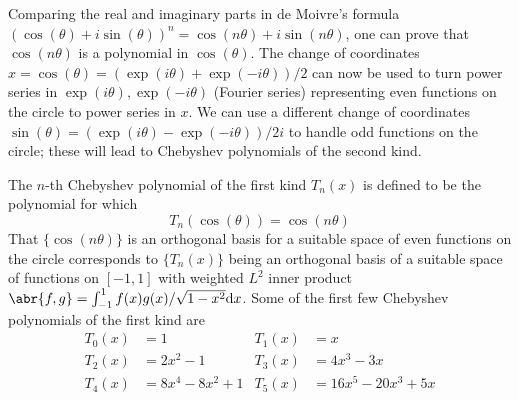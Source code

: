 \documentclass[../../rtnotes.tex]{subfiles}
\begin{document}
\begin{figure}[h]
	\centering
\end{figure}
Comparing the real and imaginary parts in de Moivre's formula $(\cos(\theta) + i\sin(\theta))^n = \cos(n\theta) + i\sin(n\theta)$, one can prove that $\cos(n\theta)$ is a polynomial in $\cos(\theta)$. The change of coordinates $x = \cos(\theta) = (\exp(i\theta)+\exp(-i\theta))/2$ can now be used to turn power series in $\exp(i\theta),\exp(-i\theta)$ (Fourier series) representing even functions on the circle to power series in $x$. We can use a different change of coordinates $\sin(\theta) = (\exp(i\theta)-\exp(-i\theta))/2i$ to handle odd functions on the circle; these will lead to Chebyshev polynomials of the second kind.

The $n$-th Chebyshev polynomial of the first kind $T_n(x)$ is defined to be the polynomial for which
\[T_n(\cos(\theta)) = \cos(n\theta)\]
That $\{\cos(n\theta)\}$ is an orthogonal basis for a suitable space of even functions on the circle corresponds to $\{T_n(x)\}$ being an orthogonal basis of a suitable space of functions on $[-1,1]$ with weighted $L^2$ inner product $\abr{f,g} = \int_{-1}^1f(x)g(x)/\sqrt{1-x^2}\dd x$.
Some of the first few Chebyshev polynomials of the first kind are 
\begin{align*}
	T_0(x) &= 1 & T_1(x) &= x\\
	T_2(x) &= 2x^2-1& T_3(x) &=4x^3-3x \\
	T_4(x) &= 8x^4-8x^2+1& T_5(x) &= 16x^5-20x^3+5x
\end{align*}
\end{document}
